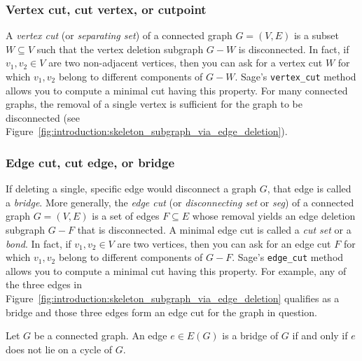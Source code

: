 \subsubsection{Vertex cut, cut vertex, or cutpoint}

A \emph{vertex cut} (or \emph{separating set}) of a connected graph
$G = (V, E)$ is a subset $W \subseteq V$ such that the vertex deletion
subgraph $G - W$ is disconnected. In fact, if $v_1, v_2 \in V$ are two
non-adjacent vertices, then you can ask for a vertex cut $W$ for which
$v_1, v_2$ belong to different components of $G - W$. Sage's
\verb!vertex_cut! method allows you to compute a minimal cut having
this property. For many connected graphs, the removal of a single
vertex is sufficient for the graph to be disconnected
(see Figure~\ref{fig:introduction:skeleton_subgraph_via_edge_deletion}).



\subsubsection{Edge cut, cut edge, or bridge}

If deleting a single, specific edge would disconnect a graph $G$, that
edge is called a \emph{bridge}. More generally, the \emph{edge cut}
(or \emph{disconnecting set} or \emph{seg}) of a connected graph
$G = (V, E)$ is a set of edges $F \subseteq E$ whose removal yields an
edge deletion subgraph $G - F$ that is disconnected. A minimal edge
cut is called a \emph{cut set} or a \emph{bond}.
In fact, if $v_1, v_2 \in V$ are two vertices, then you can ask for an
edge cut $F$ for which $v_1, v_2$ belong to different components of
$G - F$. Sage's \verb!edge_cut! method allows you to compute a minimal
cut having this property. For example, any of the three edges in
Figure~\ref{fig:introduction:skeleton_subgraph_via_edge_deletion}
qualifies as a bridge and those three edges form an edge cut for the
graph in question.

\begin{theorem}
\label{thm:inroduction:edge_is_bridge_iff_edge_not_on_cycle}
Let $G$ be a connected graph. An edge $e \in E(G)$ is a bridge of $G$
if and only if $e$ does not lie on a cycle of $G$.
\end{theorem}

